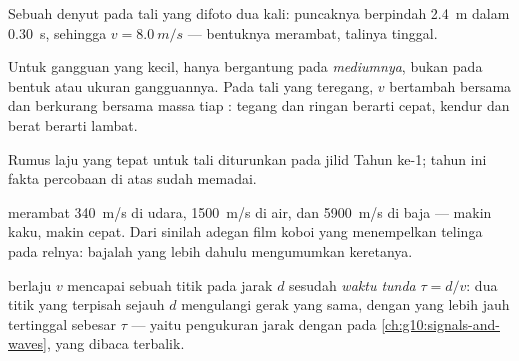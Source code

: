 \begin{omfigure}

{\small Sebuah denyut pada tali yang difoto dua kali: puncaknya
berpindah \qty{2.4}{m} dalam \qty{0.30}{s}, sehingga
$v = \qty{8.0}{m/s}$ --- bentuknya merambat, talinya tinggal.}
\end{omfigure}

\begin{proposition}\label{prop:g12:mechanical-waves:medium}
Untuk gangguan yang kecil,  hanya bergantung pada
\emph{mediumnya}, bukan pada bentuk atau ukuran gangguannya. Pada tali
yang teregang, $v$ bertambah bersama  dan berkurang bersama
massa tiap : tegang dan ringan berarti cepat, kendur dan berat
berarti lambat. \admitted
\end{proposition}

\begin{remark}\label{rem:g12:mechanical-waves:ropeformula}
Rumus laju yang tepat untuk tali diturunkan pada jilid Tahun ke-1; tahun
ini fakta percobaan di atas sudah memadai.
\end{remark}

\begin{example}\label{ex:g12:mechanical-waves:speeds}
 merambat \qty{340}{m/s} di udara, \qty{1500}{m/s} di air, dan
\qty{5900}{m/s} di baja --- makin kaku, makin cepat. Dari sinilah adegan
film koboi yang menempelkan telinga pada relnya: bajalah yang lebih
dahulu mengumumkan keretanya.
\end{example}

\begin{definition}\label{def:g12:mechanical-waves:delay}
 berlaju $v$ mencapai sebuah titik pada jarak $d$ sesudah
\emph{waktu tunda} $\tau = d/v$: dua titik yang
terpisah sejauh $d$ mengulangi gerak yang sama, dengan yang lebih jauh
tertinggal sebesar $\tau$ --- yaitu pengukuran jarak dengan  pada
\cref{ch:g10:signals-and-waves}, yang dibaca terbalik.
\end{definition}

